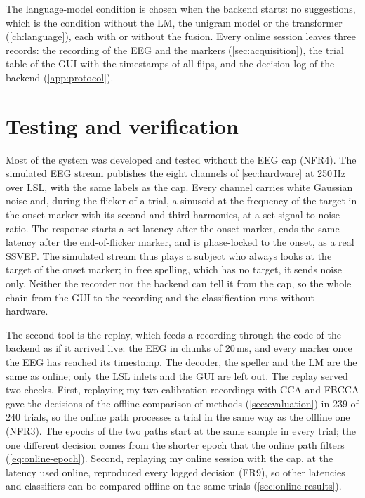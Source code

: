 The language-model condition is chosen when the backend starts: no suggestions, which
is the condition without the \ac{LM}, the unigram model or the transformer
(\cref{ch:language}), each with or without the fusion. Every online session leaves
three records: the recording of the \ac{EEG} and the markers
(\cref{sec:acquisition}), the trial table of the \ac{GUI} with the timestamps of all
flips, and the decision log of the backend (\cref{app:protocol}).

\section{Testing and verification}
\label{sec:testing}

Most of the system was developed and tested without the \ac{EEG} cap (NFR4). The
simulated \ac{EEG} stream publishes the eight channels of \cref{sec:hardware} at
250\,Hz over \ac{LSL}, with the same labels as the cap. Every channel carries white
Gaussian noise and, during the flicker of a trial, a sinusoid at the frequency of the
target in the onset marker with its second and third harmonics, at a set
signal-to-noise ratio. The response starts a set latency after the onset marker, ends
the same latency after the end-of-flicker marker, and is phase-locked to the onset, as
a real \ac{SSVEP}. The simulated stream thus plays a subject who always looks at
the target of the onset marker; in free spelling, which has no target, it sends noise
only. Neither the recorder nor the backend can tell it from the cap, so the whole chain
from the \ac{GUI} to the recording and the classification runs without hardware.

The second tool is the replay, which feeds a recording through the code of the backend
as if it arrived live: the \ac{EEG} in chunks of 20\,ms, and every marker once the
\ac{EEG} has reached its timestamp. The decoder, the speller and the \ac{LM} are the
same as online; only the \ac{LSL} inlets and the \ac{GUI} are left out. The replay
served two checks. First, replaying my two calibration recordings with \ac{CCA} and
\ac{FBCCA} gave the decisions of the offline comparison of methods
(\cref{sec:evaluation}) in 239 of 240 trials, so the online path processes a trial in
the same way as the offline one (NFR3). The epochs of the two paths start at the same
sample in every trial; the one different decision comes from the shorter epoch that the
online path filters (\cref{eq:online-epoch}). Second, replaying my online session with
the cap, at the latency used online, reproduced every logged decision (FR9), so other
latencies and classifiers can be compared offline on the same trials
(\cref{sec:online-results}).

